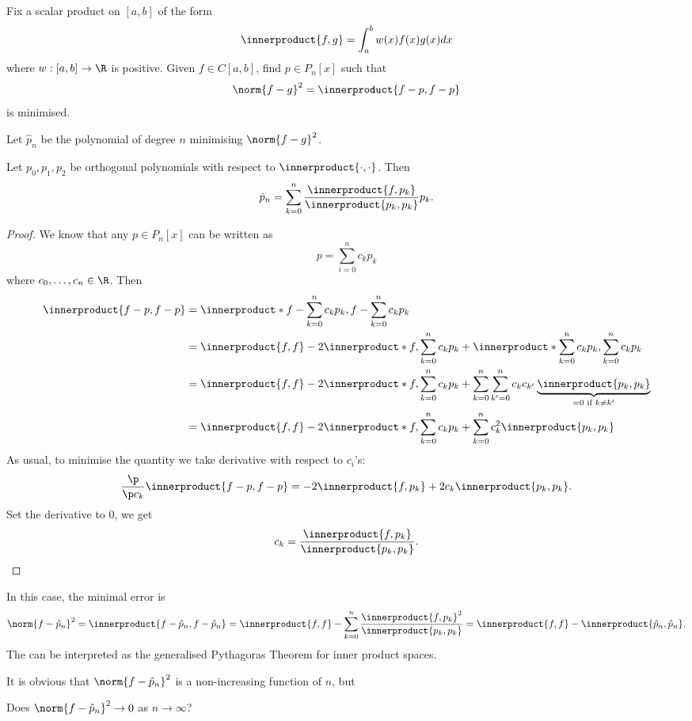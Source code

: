 \documentclass[a4paper]{article}
\newcommand*{\inner}{\innerproduct}
\begin{document}
\begin{question}
Fix a scalar product on \([a, b]\) of the form
\[
  \inner{f, g} = \int_a^b w(x)f(x)g(x) dx
\]
where \(w: [a, b] \to \R\) is positive. Given \(f \in C[a, b]\), find \(p \in P_n[x]\) such that
  \[
    \norm{f - g}^2 = \inner{f - p, f - p}
  \]
  is minimised.
\end{question}

Let \(\hat p_n\) be the polynomial of degree \(n\) minimising \(\norm{f - g}^2\).

\begin{theorem}
  Let \(p_0, p_1, p_2\) be orthogonal polynomials with respect to \(\inner{\cdot, \cdot}\). Then
  \[
    \hat p_n = \sum_{k = 0}^n \frac{\inner{f, p_k}}{\inner{p_k, p_k}} p_k.
  \]
\end{theorem}

\begin{proof}
  We know that any \(p \in P_n[x]\) can be written as
  \[
    p = \sum_{i = 0}^n c_kp_k
  \]
  where \(c_0, \dots, c_n \in \R\). Then
  \begin{align*}
    \inner{f - p, f - p} &= \inner*{f - \sum_{k = 0}^n c_kp_k, f - \sum_{k = 0}^n c_kp_k} \\
                         &= \inner{f, f} - 2\inner*{f, \sum_{k = 0}^n c_kp_k} + \inner*{\sum_{k = 0}^n c_kp_k, \sum_{k = 0}^n c_kp_k} \\
                         &= \inner{f, f} - 2\inner*{f, \sum_{k = 0}^n c_kp_k} + \sum_{k = 0}^n \sum_{k' = 0}^n c_kc_{k'}\underbrace{\inner{p_k, p_k}}_{= 0 \text{ if } k \neq k'} \\
                         &= \inner{f, f} - 2\inner*{f, \sum_{k = 0}^n c_kp_k} + \sum_{k = 0}^n c_k^2 \inner{p_k, p_k}
  \end{align*}
  As usual, to minimise the quantity we take derivative with respect to \(c_i\)'s:
  \[
    \frac{\p}{\p c_k} \inner{f - p, f - p} = -2 \inner{f, p_k}  + 2c_k \inner{p_k, p_k}.
  \]
  Set the derivative to \(0\), we get
  \[
    c_k = \frac{\inner{f, p_k}}{\inner{p_k, p_k}}.
  \]
\end{proof}

In this case, the minimal error is
\[
  \norm{f - \hat p_n}^2 = \inner{f - \hat p_n, f - \hat p_n} = \inner{f, f} - \sum_{k = 0}^n \frac{\inner{f, p_k}^2}{\inner{p_k, p_k}} = \inner{f, f} - \inner{\hat p_n, \hat p_n}.
\]
The can be interpreted as the generalised Pythagoras Theorem for inner product spaces.

It is obvious that \(\norm{f - \hat p_n}^2\) is a non-increasing function of \(n\), but
\begin{question}
  Does \(\norm{f - \hat p_n}^2 \to 0\) as \(n \to \infty\)?
\end{question}
\end{document}
